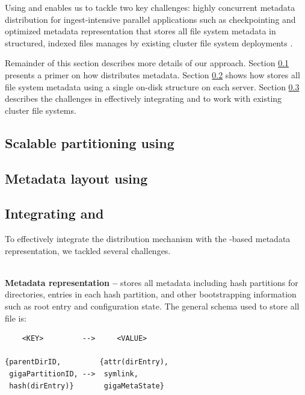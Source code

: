 Using \giga{} and \ldb{} enables us to tackle two key challenges: highly 
concurrent metadata distribution for ingest-intensive parallel applications
such as checkpointing \cite{PLFS} and 
optimized metadata representation that stores all file system
metadata in structured, indexed files manages by existing cluster file system
deployments \cite{LevelDB}. 

Remainder of this section describes more details of our approach. 
Section \ref{design.giga} presents a primer on how \giga{} distributes 
metadata. 
Section \ref{design.tablefs} shows how \ldb{} stores all file system metadata
using a single on-disk structure on each server. 
Section \ref{design.integration} describes the challenges in effectively
integrating \giga{} and \ldb{} to work with existing cluster file systems.

\subsection{Scalable partitioning using \giga{}}
\label{design.giga}


\subsection{Metadata layout using \ldb{}}
\label{design.tablefs}


\subsection{Integrating \giga{} and \ldb{}}
\label{design.integration}

To effectively integrate the \giga{} distribution mechanism with the
\ldb{}-based metadata representation, we tackled several challenges. 

~\\
\textbf{Metadata representation -- }
\ldb{} stores all metadata including \giga{} hash
partitions for directories, entries in each hash partition, and other
bootstrapping information such as root entry and \giga{} configuration state.
The general schema used to store all file is:

\begin{verbatim}
    <KEY>         -->     <VALUE> 

{parentDirID,         {attr(dirEntry),
 gigaPartitionID, -->  symlink,
 hash(dirEntry)}       gigaMetaState}
\end{verbatim}

